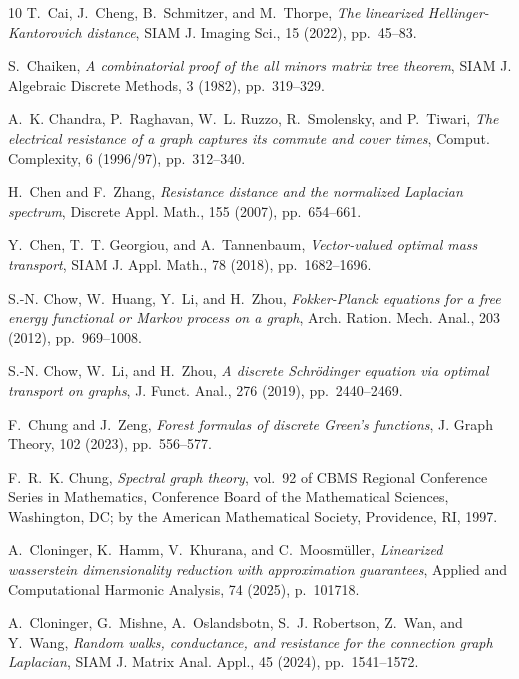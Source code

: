 \documentclass[11pt,a4paper]{article}
\begin{document}
\begin{thebibliography}{10}
    {\sc T.~Cai, J.~Cheng, B.~Schmitzer, and M.~Thorpe}, {\em The linearized {H}ellinger-{K}antorovich distance}, SIAM J. Imaging Sci., 15 (2022), pp.~45--83.

    {\sc S.~Chaiken}, {\em A combinatorial proof of the all minors matrix tree theorem}, SIAM J. Algebraic Discrete Methods, 3 (1982), pp.~319--329.

    {\sc A.~K. Chandra, P.~Raghavan, W.~L. Ruzzo, R.~Smolensky, and P.~Tiwari}, {\em The electrical resistance of a graph captures its commute and cover times}, Comput. Complexity, 6 (1996/97), pp.~312--340.

    {\sc H.~Chen and F.~Zhang}, {\em Resistance distance and the normalized {L}aplacian spectrum}, Discrete Appl. Math., 155 (2007), pp.~654--661.

    {\sc Y.~Chen, T.~T. Georgiou, and A.~Tannenbaum}, {\em Vector-valued optimal mass transport}, SIAM J. Appl. Math., 78 (2018), pp.~1682--1696.

    {\sc S.-N. Chow, W.~Huang, Y.~Li, and H.~Zhou}, {\em Fokker-{P}lanck equations for a free energy functional or {M}arkov process on a graph}, Arch. Ration. Mech. Anal., 203 (2012), pp.~969--1008.

    {\sc S.-N. Chow, W.~Li, and H.~Zhou}, {\em A discrete {S}chr\"odinger equation via optimal transport on graphs}, J. Funct. Anal., 276 (2019), pp.~2440--2469.

    {\sc F.~Chung and J.~Zeng}, {\em Forest formulas of discrete {G}reen's functions}, J. Graph Theory, 102 (2023), pp.~556--577.

    {\sc F.~R.~K. Chung}, {\em Spectral graph theory}, vol.~92 of CBMS Regional Conference Series in Mathematics, Conference Board of the Mathematical Sciences, Washington, DC; by the American Mathematical Society, Providence, RI, 1997.

    {\sc A.~Cloninger, K.~Hamm, V.~Khurana, and C.~Moosm{\"u}ller}, {\em Linearized wasserstein dimensionality reduction with approximation guarantees}, Applied and Computational Harmonic Analysis, 74 (2025), p.~101718.

    {\sc A.~Cloninger, G.~Mishne, A.~Oslandsbotn, S.~J. Robertson, Z.~Wan, and Y.~Wang}, {\em Random walks, conductance, and resistance for the connection graph {L}aplacian}, SIAM J. Matrix Anal. Appl., 45 (2024), pp.~1541--1572.


\end{thebibliography}
\end{document}
